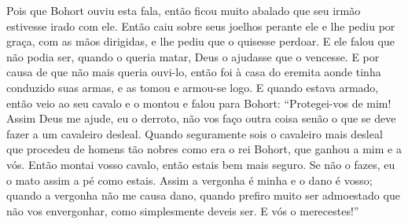 Pois que Bohort ouviu esta fala, então ficou muito abalado que seu irmão
estivesse irado com ele. Então caiu sobre seus joelhos perante ele e lhe pediu
por graça, com as mãos dirigidas, e lhe pediu que o quisesse perdoar. E ele
falou que não podia ser, quando o queria matar, Deus o ajudasse que o vencesse.
E por causa de que não mais queria ouvi-lo, então foi à casa do eremita aonde
tinha conduzido suas armas, e as tomou e armou-se logo. E quando estava armado,
então veio ao seu cavalo e o montou e falou para Bohort: “Protegei-vos de mim!
Assim Deus me ajude, eu o derroto, não vos faço outra coisa senão o que se deve
fazer a um cavaleiro desleal. Quando seguramente sois o cavaleiro mais desleal
que procedeu de homens tão nobres como era o rei Bohort, que ganhou a mim e a
vós. Então montai vosso cavalo, então estais bem mais seguro. Se não o
fazes, eu o mato assim a pé como estais. Assim a vergonha é minha e o dano é
vosso; quando a vergonha não me causa dano, quando prefiro muito ser admoestado
que não vos envergonhar, como simplesmente deveis ser. E vós o merecestes!” 


